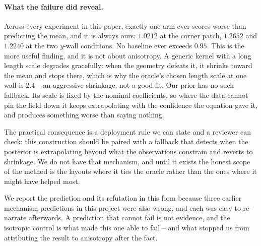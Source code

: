 \paragraph{What the failure did reveal.}
Across every experiment in this paper, exactly one arm ever scores worse than
predicting the mean, and it is always ours: $1.0212$ at the corner patch,
$1.2652$ and $1.2240$ at the two $y$-wall conditions.  No baseline ever exceeds
$0.95$.  This is the more useful finding, and it is not about anisotropy.  A
generic kernel with a long length scale degrades gracefully: when the geometry
defeats it, it shrinks toward the mean and stops there, which is why the oracle's
chosen length scale at one wall is $2.4$ -- an aggressive shrinkage, not a good
fit.  Our prior has no such fallback.  Its scale is fixed by the nominal
coefficients, so where the data cannot pin the field down it keeps extrapolating
with the confidence the equation gave it, and produces something worse than
saying nothing.

The practical consequence is a deployment rule we can state and a reviewer can
check: this construction should be paired with a fallback that detects when the
posterior is extrapolating beyond what the observations constrain and reverts to
shrinkage.  We do not have that mechanism, and until it exists the honest scope
of the method is the layouts where it ties the oracle rather than the ones where
it might have helped most.

We report the prediction and its refutation in this form because three earlier
mechanism predictions in this project were also wrong, and each was easy to
re-narrate afterwards.  A prediction that cannot fail is not evidence, and the
isotropic control is what made this one able to fail -- and what stopped us from
attributing the result to anisotropy after the fact.
